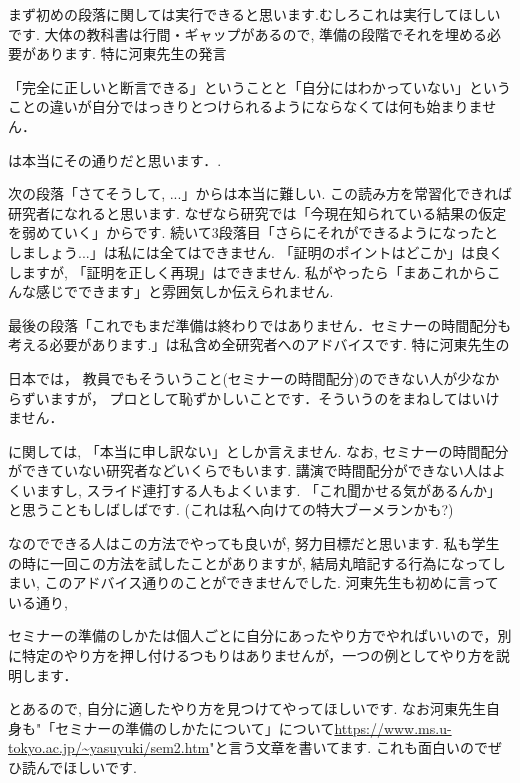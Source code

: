 まず初めの段落に関しては実行できると思います.むしろこれは実行してほしいです. 
大体の教科書は行間・ギャップがあるので, 準備の段階でそれを埋める必要があります. 
特に河東先生の発言
\begin{tcolorbox}[mybox]
「完全に正しいと断言できる」ということと「自分にはわかっていない」ということの違いが自分ではっきりとつけられるようにならなくては何も始まりません．
\end{tcolorbox}
は本当にその通りだと思います．. 

次の段落「さてそうして, ...」からは本当に難しい. この読み方を常習化できれば研究者になれると思います. 
なぜなら研究では「今現在知られている結果の仮定を弱めていく」からです. 
続いて3段落目「さらにそれができるようになったとしましょう...」は私には全てはできません. 「証明のポイントはどこか」は良くしますが, 「証明を正しく再現」はできません. 私がやったら「まあこれからこんな感じでできます」と雰囲気しか伝えられません.  

最後の段落「これでもまだ準備は終わりではありません．セミナーの時間配分も考える必要があります.」は私含め全研究者へのアドバイスです. 
特に河東先生の
\begin{tcolorbox}[mybox]
日本では， 教員でもそういうこと(セミナーの時間配分)のできない人が少なからずいますが， プロとして恥ずかしいことです．そういうのをまねしてはいけません．
\end{tcolorbox}
に関しては, 「本当に申し訳ない」としか言えません. 
なお, セミナーの時間配分ができていない研究者などいくらでもいます. 
講演で時間配分ができない人はよくいますし, スライド連打する人もよくいます. 
「これ聞かせる気があるんか」と思うこともしばしばです. (これは私へ向けての特大ブーメランかも?)

なのでできる人はこの方法でやっても良いが, 努力目標だと思います.
私も学生の時に一回この方法を試したことがありますが, 結局丸暗記する行為になってしまい, このアドバイス通りのことができませんでした. 
河東先生も初めに言っている通り, 
\begin{tcolorbox}[mybox]
セミナーの準備のしかたは個人ごとに自分にあったやり方でやればいいので，別に特定のやり方を押し付けるつもりはありませんが，一つの例としてやり方を説明します．
\end{tcolorbox}
とあるので, 自分に適したやり方を見つけてやってほしいです. なお河東先生自身も"「セミナーの準備のしかたについて」について\url{https://www.ms.u-tokyo.ac.jp/~yasuyuki/sem2.htm}"と言う文章を書いてます. これも面白いのでぜひ読んでほしいです. 

